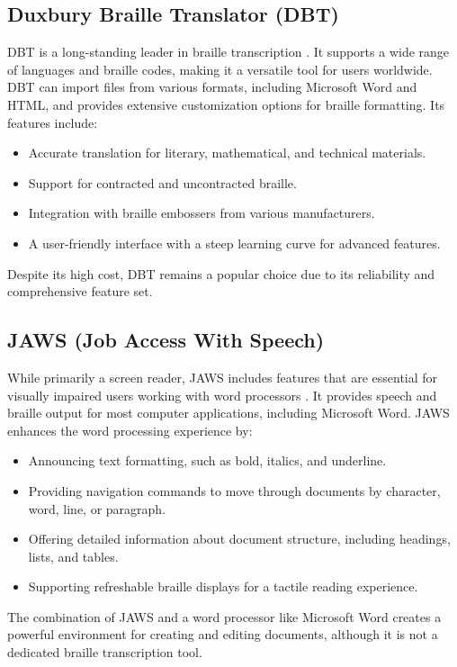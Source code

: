 \subsection{Duxbury Braille Translator (DBT)}\label{ch12:ssec:dbt}
DBT is a long-standing leader in braille transcription \supercite{Duxbury}. It supports a wide range of languages and braille codes, making it a versatile tool for users worldwide. DBT can import files from various formats, including Microsoft Word and HTML, and provides extensive customization options for braille formatting. Its features include:
\begin{itemize}
	\item Accurate translation for literary, mathematical, and technical materials.
	\item Support for contracted and uncontracted braille.
	\item Integration with braille embossers from various manufacturers.
	\item A user-friendly interface with a steep learning curve for advanced features.
\end{itemize}
Despite its high cost, DBT remains a popular choice due to its reliability and comprehensive feature set.

\subsection{JAWS (Job Access With Speech)}\label{ch12:ssec:jaws}
While primarily a screen reader, JAWS includes features that are essential for visually impaired users working with word processors \supercite{FreedomScientificJAWS}. It provides speech and braille output for most computer applications, including Microsoft Word. JAWS enhances the word processing experience by:
\begin{itemize}
	\item Announcing text formatting, such as bold, italics, and underline.
	\item Providing \gls{navigation} commands to move through documents by character, word, line, or paragraph.
	\item Offering detailed information about document structure, including headings, lists, and tables.
	\item Supporting refreshable braille displays for a tactile reading experience.
\end{itemize}
The combination of JAWS and a word processor like Microsoft Word creates a powerful environment for creating and editing documents, although it is not a dedicated braille transcription tool.

